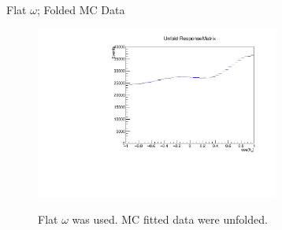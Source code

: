\documentclass[
		10pt
		]{beamer}
\begin{document}
\begin{frame}{Flat $\omega$; Folded MC Data}
	
	
	\begin{figure}
		
		
		
		\includegraphics[width=8cm]{Plots/FlatMC.pdf}\\
		\captionsetup{labelformat=empty}
		\caption{Flat $\omega$ was used. MC fitted data were unfolded.}
	\end{figure}
\end{frame}


\fi
\end{document}

